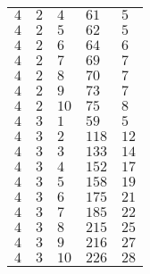 \begin{table}[ht]
\begin{tabular}{l|l|l|l|l}
$4$ & $2$ & $4$ & $61$ & $5$\\
$4$ & $2$ & $5$ & $62$ & $5$\\
$4$ & $2$ & $6$ & $64$ & $6$\\
$4$ & $2$ & $7$ & $69$ & $7$\\
$4$ & $2$ & $8$ & $70$ & $7$\\
$4$ & $2$ & $9$ & $73$ & $7$\\
$4$ & $2$ & $10$ & $75$ & $8$\\
$4$ & $3$ & $1$ & $59$ & $5$\\
$4$ & $3$ & $2$ & $118$ & $12$\\
$4$ & $3$ & $3$ & $133$ & $14$\\
$4$ & $3$ & $4$ & $152$ & $17$\\
$4$ & $3$ & $5$ & $158$ & $19$\\
$4$ & $3$ & $6$ & $175$ & $21$\\
$4$ & $3$ & $7$ & $185$ & $22$\\
$4$ & $3$ & $8$ & $215$ & $25$\\
$4$ & $3$ & $9$ & $216$ & $27$\\
$4$ & $3$ & $10$ & $226$ & $28$\\
\end{tabular}
\end{table}

